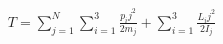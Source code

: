 \documentclass[preview]{standalone}
\begin{document}
\begin{align*}
T = \sum_{j=1}^N \sum_{i=1}^3\frac{p_ij^2}{2m_j} + \sum_{i=1}^3\frac{L_ij^2}{2I_j}
\end{align*}
\end{document}
